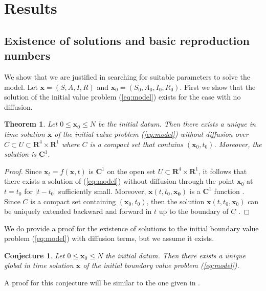 \documentclass[11pt]{article}
\newcommand{\R}{\mathbf{R}}
\newcommand{\C}{\mathbf{C}}
\renewcommand\vec{\mathbf}
\newtheorem{theorem}{Theorem}
\newtheorem{conjecture}{Conjecture}
\begin{document}
\section{Results}
	\subsection{Existence of solutions and basic reproduction numbers}
		We show that we are justified in searching for suitable parameters to solve the model.
		Let $\vec{x} = (S,  A, I, R)$ and $\vec{x}_0 = (S_0, A_0, I_0, R_0)$.
		First we show that the solution of the initial value problem (\ref{eq:model}) exists for the case with no diffusion.
		\begin{theorem}
			Let $0 \leq \vec{x}_0 \leq N$ be the initial datum.
			Then there exists a unique in time solution $\vec{x}$ of the initial value problem (\ref{eq:model}) without diffusion over $C \subset U \subset \R^4 \times \R^1$ where $C$ is a compact set that contains $(\vec{x}_0, t_0)$.
			Moreover, the solution is $\C^1$.
		\end{theorem}
		\begin{proof}
			Since $\vec{x}_t = f(\vec{x},t)$ is $\C^1$ on the open set $U \subset \R^4 \times \R^1$, it follows that there exists a solution of (\ref{eq:model}) without diffusion through the point $\vec{x}_0$ at $t = t_0$ for $|t - t_0|$ sufficiently small.
			Moreover, $\vec{x} (t, t_0,\vec{x_0})$ is a $\C^1$ function \cite{dynamics}.
			Since $C$ is a compact set containing $(\vec{x}_0, t_0)$, then the solution $\vec{x} (t, t_0, \vec{x}_0)$ can be uniquely extended backward and forward in $t$ up to the boundary of $C$ \cite{dynamics}.
		\end{proof}
		\noindent We do provide a proof for the existence of solutions to the initial boundary value problem (\ref{eq:model}) with diffusion terms, but we assume it exists.
		\begin{conjecture}
			Let $0 \leq \vec{x}_0 \leq N$ the initial datum.
			Then there exists a unique global in time solution $\vec{x}$ of the initial boundary value problem (\ref{eq:model}).
		\end{conjecture}
		\noindent A proof for this conjecture will be similar to the one given in \cite{Mammeri+2020+102+113}.
		
\end{document}
